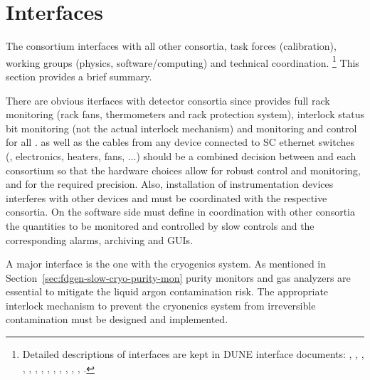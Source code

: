 \section{Interfaces}
\label{sec:fdgen-slow-cryo-intfc}


The  consortium interfaces with all other consortia, task forces (calibration), working groups (physics, software/computing) and technical coordination.
\footnote{
Detailed descriptions of  interfaces are kept in DUNE  interface documents: 
 \cite{bib:docdb6745},
\cite{bib:docdb6991},
\cite{bib:docdb6790},
\cite{bib:docdb6787},
\cite{bib:docdb6784},
\cite{bib:docdb6781},
\cite{bib:docdb6760},
\cite{bib:docdb6679},
\cite{bib:docdb6730},
\cite{bib:docdb7126},
\cite{bib:docdb7099},
\cite{bib:docdb7072},
\cite{bib:docdb7045},
\cite{bib:docdb7018}.} This section provides a brief summary. 

There are obvious iterfaces with detector consortia since  provides full rack monitoring (rack fans, thermometers and rack protection system),
interlock status bit monitoring (not the actual interlock mechanism) and monitoring and control for all \pwrsupps. %
\pwrsupps as well as the cables from any device connected to SC ethernet switches (\pwrsupps, electronics, heaters, fans, ...)
should be a combined decision between  and each consortium so that the hardware choices allow for robust control and monitoring, and for the required precision. %
Also, installation of instrumentation devices interferes with other devices and must be coordinated with the respective consortia.  
On the software side  must define in coordination with other consortia the quantities to be monitored and controlled by slow controls and the corresponding alarms,
archiving and GUIs. 



A major interface is the one with the cryogenics system. As mentioned in Section~\ref{sec:fdgen-slow-cryo-purity-mon} purity monitors and gas analyzers are essential
to mitigate the liquid argon contamination risk. The appropriate interlock mechanism to prevent the cryonenics system from irreversible contamination
must be designed and implemented. 


